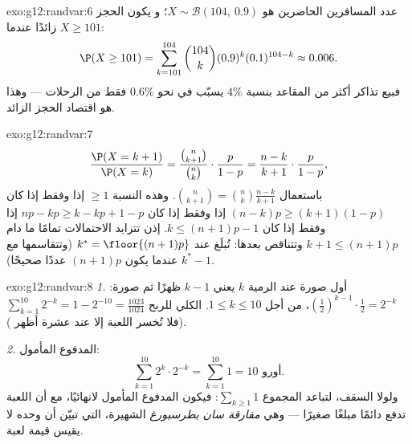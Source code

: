 \begin{solution}{exo:g12:randvar:6}
عدد المسافرين الحاضرين هو $X \sim \mathcal B(104,\ 0.9)$؛ و
يكون الحجز زائدًا عندما $X \geq 101$:
\[
\P(X \geq 101) = \sum_{k=101}^{104}\binom{104}{k}(0.9)^k(0.1)^{104-k}
\approx 0.006 .
\]
فبيع تذاكر أكثر من المقاعد بنسبة $4\%$ يسبّب  في نحو
$0.6\%$ فقط من الرحلات --- وهذا هو اقتصاد الحجز الزائد.
\end{solution}

\begin{solution}{exo:g12:randvar:7}
\[
\frac{\P(X = k+1)}{\P(X = k)}
= \frac{\binom{n}{k+1}}{\binom nk}\cdot\frac{p}{1-p}
= \frac{n - k}{k + 1}\cdot\frac{p}{1-p},
\]
باستعمال $\binom{n}{k+1} = \binom nk \frac{n-k}{k+1}$. وهذه النسبة $\geq 1$
إذا وفقط إذا كان $(n-k)p \geq (k+1)(1-p)$ إذا وفقط إذا كان $np - k p \geq k - kp + 1 - p$ إذا وفقط إذا كان
$k \leq (n+1)p - 1$. إذن تتزايد الاحتمالات تمامًا ما دام
$k + 1 \leq (n+1)p$ وتتناقص بعدها:  تُبلَغ عند
$k^* = \floor{(n+1)p}$ (وتتقاسمها مع $k^* - 1$ عندما يكون $(n+1)p$ عددًا
صحيحًا).
\end{solution}

\begin{solution}{exo:g12:randvar:8}
\emph{1.} أول صورة عند الرمية $k$ يعني $k-1$ ظهرًا ثم صورة:
 $\left(\frac12\right)^{k-1}\cdot\frac12 = 2^{-k}$، من أجل
$1 \leq k \leq 10$.  الكلي للربح
$\sum_{k=1}^{10} 2^{-k} = 1 - 2^{-10} = \frac{1023}{1024}$ (فلا تُخسر اللعبة
إلا عند عشرة أظهر ).

\emph{2.} المدفوع المأمول:
\[
\sum_{k=1}^{10} 2^k \cdot 2^{-k} = \sum_{k=1}^{10} 1 = 10 \text{ أورو}.
\]
ولولا السقف، لتباعد المجموع $\sum_{k\geq1} 1$: فيكون المدفوع المأمول
لانهائيًا، مع أن اللعبة تدفع دائمًا  مبلغًا صغيرًا --- وهي
\emph{مفارقة سان بطرسبورغ} الشهيرة، التي تبيّن أن  وحده
لا يقيس قيمة لعبة.
\end{solution}

